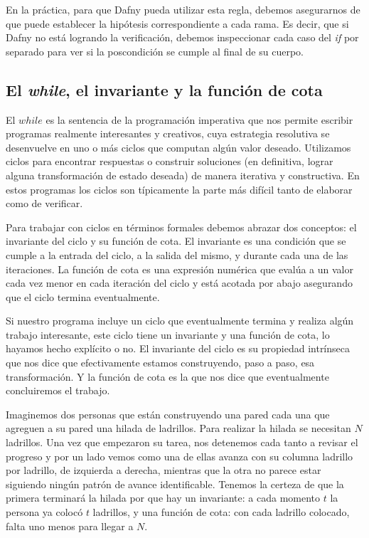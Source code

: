 \documentclass[12pt, a4paper, openany, fleqn]{book}
\begin{document}
    En la práctica, para que Dafny pueda utilizar esta regla, debemos asegurarnos de que puede establecer la hipótesis correspondiente a cada rama. Es decir, que si Dafny no está logrando la verificación, debemos inspeccionar cada caso del \textit{if} por separado para ver si la poscondición se cumple al final de su cuerpo.


    \subsection{El \textit{while}, el invariante y la función de cota}
    El $while$ es la sentencia de la programación imperativa que nos permite escribir programas realmente interesantes y creativos, cuya estrategia resolutiva se desenvuelve en uno o más ciclos que computan algún valor deseado. Utilizamos ciclos para encontrar respuestas o construir soluciones (en definitiva, lograr alguna transformación de estado deseada) de manera iterativa y constructiva. En estos programas los ciclos son típicamente la parte más difícil tanto de elaborar como de verificar.

    Para trabajar con ciclos en términos formales debemos abrazar dos conceptos: el invariante del ciclo y su función de cota.
    El invariante es una condición que se cumple a la entrada del ciclo, a la salida del mismo, y durante cada una de las iteraciones. La función de cota es una expresión numérica que evalúa a un valor cada vez menor en cada iteración del ciclo y está acotada por abajo asegurando que el ciclo termina eventualmente.

    Si nuestro programa incluye un ciclo que eventualmente termina y realiza algún trabajo interesante, este ciclo tiene un invariante y una función de cota, lo hayamos hecho explícito o no. El invariante del ciclo es su propiedad intrínseca que nos dice que efectivamente estamos construyendo, paso a paso, esa transformación. Y la función de cota es la que nos dice que eventualmente concluiremos el trabajo.

    Imaginemos dos personas que están construyendo una pared cada una que agreguen a su pared una hilada de ladrillos. Para realizar la hilada se necesitan $N$ ladrillos. Una vez que empezaron su tarea, nos detenemos cada tanto a revisar el progreso y por un lado vemos como una de ellas avanza con su columna ladrillo por ladrillo, de izquierda a derecha, mientras que la otra no parece estar siguiendo ningún patrón de avance identificable. Tenemos la certeza de que la primera terminará la hilada por que hay un invariante: a cada momento $t$ la persona ya colocó $t$ ladrillos, y una función de cota: con cada ladrillo colocado, falta uno menos para llegar a $N$.
\end{document}
